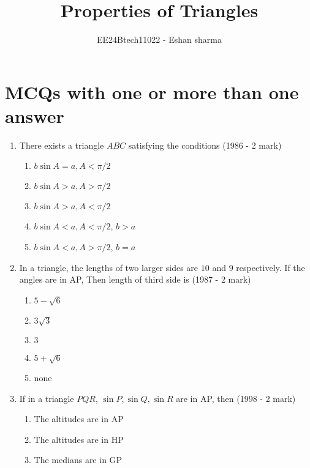 \documentclass[journal,12pt,twocolumn]{IEEEtran}
\theoremstyle{remark}
\begin{document}

\vspace{3cm}

\title{Properties of Triangles}
\author{EE24Btech11022 - Eshan sharma}
\maketitle
\newpage
\bigskip

\renewcommand{\thefigure}{\theenumi}
\renewcommand{\thetable}{\theenumi}


\section{MCQs with one or more than one answer}
\begin{enumerate}
	\item There exists a triangle $ABC$ satisfying the conditions
    \hfill{(1986 - 2 mark)}
    \begin{enumerate}
    \item $b\sin{A} = a, A <\pi/2$
    \item $b\sin{A} > a, A >\pi/2$
    \item $b\sin{A} > a, A <\pi/2$
    \item $b\sin{A} < a, A <\pi/2$, $b > a$
    \item $b\sin{A} < a, A >\pi/2$, $b = a$
    \end{enumerate}
    \item In a triangle, the lengths of two larger sides are $10$ and $9$ respectively. If the angles are in AP, Then length of third side is
    \hfill{(1987 - 2 mark)}
    \begin{multicols}{2}
    \begin{enumerate}
    \item $5-\sqrt{6}$ 
    \item $3\sqrt{3}$
    \item $3$
    \item $5+\sqrt{6}$ 
    \item none
    \end{enumerate}
    \end{multicols}
    \item If in a triangle $PQR$, $\sin{P}, \sin{Q}, \sin{R}$ are in AP, then
    \hfill{(1998 - 2 mark)}
    \begin{enumerate}
    \item The altitudes are in AP
    \item The altitudes are in HP
    \item The medians are in GP

\end{enumerate}
\end{enumerate}
\end{document}
